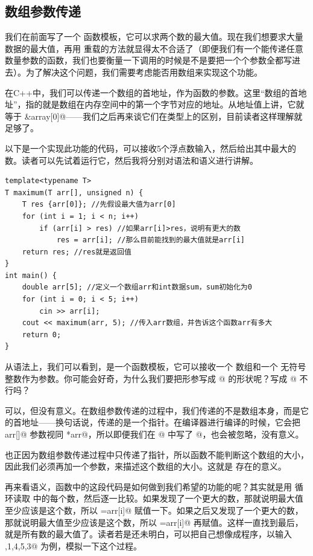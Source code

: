 \subsection*{数组参数传递}
我们在前面写了一个 \lstinline@maximum@ 函数模板，它可以求两个数的最大值。现在我们想要求大量数据的最大值，再用 \lstinline@maximum@ 重载的方法就显得太不合适了（即便我们有一个能传递任意数量参数的函数，我们也要衡量一下调用的时候是不是要把一个个参数全都写进去）。为了解决这个问题，我们需要考虑能否用数组来实现这个功能。\par
在C++中，我们可以传递一个数组的首地址，作为函数的参数。这里``数组的首地址''，指的就是数组在内存空间中的第一个字节对应的地址。从地址值上讲，它就等于 \lstinline@&array[0]@——我们之后再来谈它们在类型上的区别，目前读者这样理解就足够了。\par
以下是一个实现此功能的代码，可以接收5个浮点数输入，然后给出其中最大的数。读者可以先试着运行它，然后我将分别对语法和语义进行讲解。
\begin{lstlisting}
template<typename T>
T maximum(T arr[], unsigned n) {
    T res {arr[0]}; //先假设最大值为arr[0]
    for (int i = 1; i < n; i++)
        if (arr[i] > res) //如果arr[i]>res，说明有更大的数
            res = arr[i]; //那么目前能找到的最大值就是arr[i]
    return res; //res就是返回值
}
int main() {
    double arr[5]; //定义一个数组arr和int数据sum，sum初始化为0
    for (int i = 0; i < 5; i++)
        cin >> arr[i];
    cout << maximum(arr, 5); //传入arr数组，并告诉这个函数arr有多大
    return 0;
}
\end{lstlisting}\par
从语法上，我们可以看到，\lstinline@maximum@ 是一个函数模板，它可以接收一个 \lstinline@arr@ 数组和一个 \lstinline@n@ 无符号整数作为参数。你可能会好奇，为什么我们要把形参写成 \lstinline@arr[]@ 的形状呢？写成 \lstinline@arr[5]@ 不行吗？\par
可以，但没有意义。在数组参数传递的过程中，我们传递的不是数组本身，而是它的首地址——换句话说，传递的是一个指针。在编译器进行编译的时候，它会把 \lstinline@T arr[]@ 参数视同 \lstinline@T *arr@，所以即便我们在 \lstinline@arr[]@ 中写了 @，也会被忽略，没有意义。\par
也正因为数组参数传递过程中只传递了指针，所以函数不能判断这个数组的大小，因此我们必须再加一个参数，来描述这个数组的大小。这就是 \lstinline@n@ 存在的意义。\par
再来看语义，\lstinline@maximum@ 函数中的这段代码是如何做到我们希望的功能的呢？其实就是用 \lstinline@for@ 循环读取 \lstinline@arr@ 中的每个数，然后逐一比较。如果发现了一个更大的数，那就说明最大值至少应该是这个数，所以 \lstinline@ref=arr[i]@ 赋值一下。如果之后又发现了一个更大的数，那就说明最大值至少应该是这个数，所以 \lstinline@ref=arr[i]@ 再赋值。这样一直找到最后，\lstinline@res@ 就是所有数的最大值了。读者若是还未明白，可以把自己想像成程序，以输入 ,1,4,5,3@ 为例，模拟一下这个过程。\par
